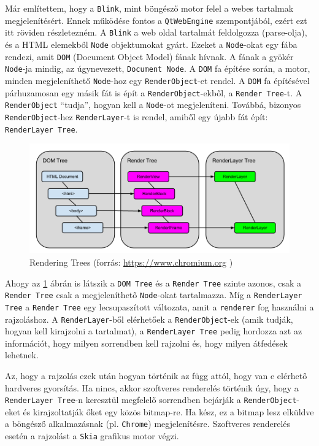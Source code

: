 \documentclass[12pt]{report}
\let\origurl\url
\renewcommand{\url}[1]{%
    \textcolor{blue}{\origurl{#1}}
}
\begin{document}
Már említettem, hogy a \texttt{Blink}, mint böngésző motor felel a webes tartalmak
megjelenítésért. Ennek működése fontos a \texttt{QtWebEngine} szempontjából, ezért ezt itt
röviden részletezném.
A \texttt{Blink} a web oldal tartalmát feldolgozza (parse-olja), és a HTML elemekből
\texttt{Node} objektumokat gyárt. Ezeket a \texttt{Node}-okat egy fába rendezi, amit
\texttt{DOM} (Document Object Model) fának hívnak. A fának a gyökér \texttt{Node}-ja mindig,
az úgynevezett, \texttt{Document Node}. A \texttt{DOM} fa építése során, a motor, minden
megjeleníthető \texttt{Node}-hoz egy \texttt{RenderObject}-et rendel. A \texttt{DOM} fa
építésével párhuzamosan egy másik fát is épít a \texttt{RenderObject}-ekből, a
\texttt{Render Tree}-t. A \texttt{RenderObject} ``tudja'', hogyan kell a \texttt{Node}-ot
megjeleníteni. Továbbá, bizonyos \texttt{RenderObject}-hez \texttt{RenderLayer}-t is
rendel, amiből egy újabb fát épít: \texttt{RenderLayer Tree}.

\begin{figure}[h]
    \centering
    \includegraphics[scale=0.46]{rendering_trees}
    \caption{
        \label{fig-rendering-trees}
        Rendering Trees (forrás: \url{https://www.chromium.org} \cite{bib-chromium-oopifs})
    }
\end{figure}

Ahogy az \ref{fig-rendering-trees} ábrán is látszik a \texttt{DOM Tree} és a
\texttt{Render Tree} szinte azonos, csak a \texttt{Render Tree} csak a megjeleníthető
\texttt{Node}-okat tartalmazza. Míg a \texttt{RenderLayer Tree} a \texttt{Render Tree} egy
lecsupaszított változata, amit a \texttt{renderer} fog használni a rajzoláshoz.
A \texttt{RenderLayer}-ből elérhetőek a \texttt{RenderObject}-ek (amik tudják, hogyan
kell kirajzolni a tartalmat), a \texttt{RenderLayer Tree} pedig hordozza azt az információt,
hogy milyen sorrendben kell rajzolni és, hogy milyen átfedések lehetnek.

Az, hogy a rajzolás ezek után hogyan történik az függ attól, hogy van e elérhető hardveres
gyorsítás. Ha nincs, akkor szoftveres renderelés történik úgy, hogy a \\
\texttt{RenderLayer Tree}-n keresztül megfelelő sorrendben bejárják a
\texttt{RenderObject}-eket és kirajzoltatják őket egy közös bitmap-re. Ha kész, ez a bitmap
lesz elküldve a böngésző alkalmazásnak (pl. \texttt{Chrome}) megjelenítésre. Szoftveres
renderelés esetén a rajzolást a \texttt{Skia} grafikus motor végzi.
\end{document}
